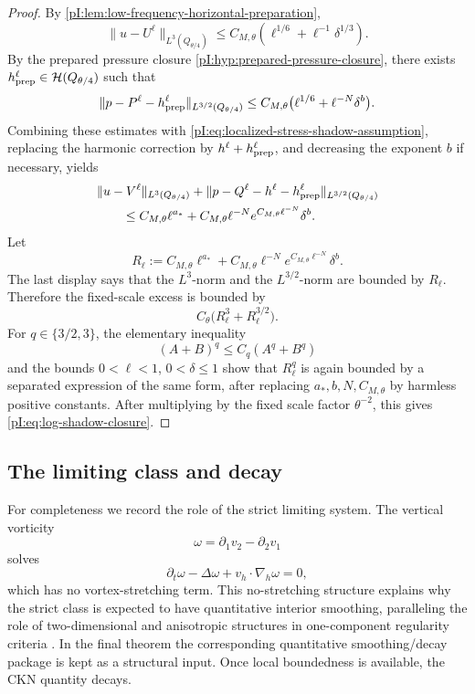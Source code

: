 \documentclass[11pt]{article}
\numberwithin{equation}{section}
\theoremstyle{plain}
\theoremstyle{definition}
\theoremstyle{remark}
\newcommand{\nabh}{\nabla_h}
\newcommand{\calH}{\mathcal H}
\begin{document}
\begin{proof}
By \cref{pI:lem:low-frequency-horizontal-preparation},
\[
        \|u-U^\ell\|_{L^3(Q_{\theta/4})}
        \le C_{M,\theta}(\ell^{1/6}+\ell^{-1}\delta^{1/3}).
\]
By the prepared pressure closure \cref{pI:hyp:prepared-pressure-closure}, there exists \(h_{\rm prep}^\ell\in\calH(Q_{\theta/4})\) such that
\[
        \|p-P^\ell-h_{\rm prep}^\ell\|_{L^{3/2}(Q_{\theta/4})}
        \le C_{M,\theta}\bigl(\ell^{1/6}+\ell^{-N}\delta^b\bigr).
\]
Combining these estimates with \eqref{pI:eq:localized-stress-shadow-assumption}, replacing the harmonic correction by \(h^\ell+h_{\rm prep}^\ell\), and decreasing the exponent \(b\) if necessary, yields
\[
\begin{aligned}
&\|u-V^\ell\|_{L^3(Q_{\theta/4})}
+\|p-Q^\ell-h^\ell-h_{\rm prep}^\ell\|_{L^{3/2}(Q_{\theta/4})}\\
&\qquad\le C_{M,\theta}\ell^{a_*}
+C_{M,\theta}\ell^{-N}e^{C_{M,\theta}\ell^{-N}}\delta^b.
\end{aligned}
\]
Let
\[
        R_\ell:=C_{M,\theta}\ell^{a_*}
        +C_{M,\theta}\ell^{-N}e^{C_{M,\theta}\ell^{-N}}\delta^b .
\]
The last display says that the \(L^3\)-norm and the \(L^{3/2}\)-norm are bounded by \(R_\ell\).  Therefore the fixed-scale excess is bounded by
\[
        C_\theta\bigl(R_\ell^3+R_\ell^{3/2}\bigr).
\]
For \(q\in\{3/2,3\}\), the elementary inequality
\[
        (A+B)^q\le C_q(A^q+B^q)
\]
and the bounds \(0<\ell<1\), \(0<\delta\le1\) show that \(R_\ell^q\) is again bounded by a separated expression of the same form, after replacing \(a_*,b,N,C_{M,\theta}\) by harmless positive constants.  After multiplying by the fixed scale factor \(\theta^{-2}\), this gives \eqref{pI:eq:log-shadow-closure}.
\end{proof}

\subsection{The limiting class and decay}\label{pI:sec:limiting-decay}

For completeness we record the role of the strict limiting system.  The vertical vorticity
\[
        \omega=\partial_1v_2-\partial_2v_1
\]
solves
\[
        \partial_t\omega-\Delta\omega+v_h\cdot\nabh\omega=0,
\]
which has no vortex-stretching term.  This no-stretching structure explains why the strict class is expected to have quantitative interior smoothing, paralleling the role of two-dimensional and anisotropic structures in one-component regularity criteria \cite{KukavicaZiane2006,KukavicaZiane2007,CheminZhang2016,KangNguyen2023}.  In the final theorem the corresponding quantitative smoothing/decay package is kept as a structural input.  Once local boundedness is available, the CKN quantity decays.
\end{document}
